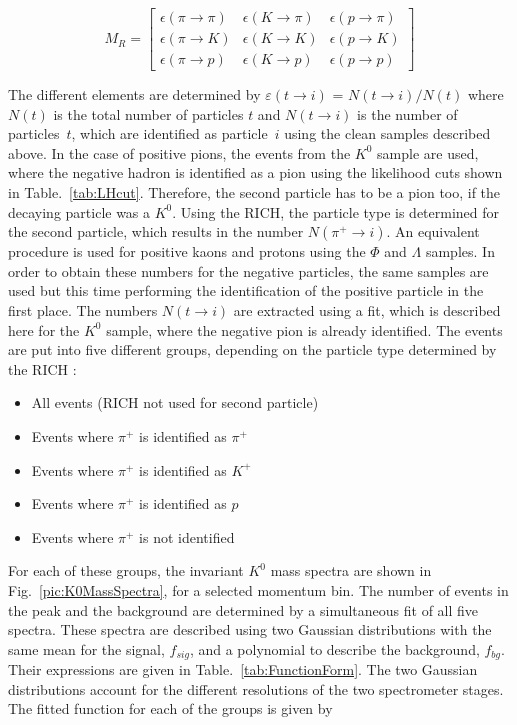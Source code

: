 \begin{equation}
  M_R
  =
  \begin{bmatrix}
  \epsilon(\pi \rightarrow \pi) & \epsilon(K \rightarrow \pi) & \epsilon(p \rightarrow \pi)\\
  \epsilon(\pi \rightarrow K) & \epsilon(K \rightarrow K) & \epsilon(p \rightarrow K) \\
  \epsilon(\pi \rightarrow p) & \epsilon(K \rightarrow p) & \epsilon(p \rightarrow p)
  \end{bmatrix}
\end{equation}

The different elements are determined by $\varepsilon(t \rightarrow i)$ = $N(t \rightarrow i)/N(t)$ where $N(t)$ is the total number of particles $t$ and $N(t \rightarrow i)$ is the number of particles~$t$, which are identified as particle~$i$ using the clean samples described above. In the case of positive pions, the events from the $K^0$ sample are used, where the negative hadron is identified as a pion using the likelihood cuts shown in Table.~\ref{tab:LHcut}.  Therefore, the second particle has to be a pion too, if the decaying particle was a $K^0$. Using the RICH, the particle type is determined for the second particle, which  results in the number $N(\pi^+ \rightarrow i)$. An equivalent procedure is used for positive kaons and protons using the $\Phi$ and $\Lambda$ samples. In order to obtain these numbers for the negative particles, the same samples are used but this time performing the identification of the positive particle in the first place. The numbers $N(t \rightarrow i)$ are extracted using a fit, which is described here for the $K^0$ sample, where the negative pion is already identified. The events are put into five different groups, depending on the particle type determined by the RICH :

\begin{itemize}
  \item All events (RICH not used for second particle)
  \item Events where $\pi^+$ is identified as $\pi^+$
  \item Events where $\pi^+$ is identified as $K^+$
  \item Events where $\pi^+$ is identified as $p$
  \item Events where $\pi^+$ is not identified
\end{itemize}

For each of these groups, the invariant $K^0$ mass spectra are shown in Fig.~\ref{pic:K0MassSpectra}, for a selected momentum bin. The number of events in the peak and the background are determined by a simultaneous fit of all five spectra. These spectra are described using two Gaussian distributions with the same mean for the signal, $f_{sig}$, and a polynomial to describe the background, $f_{bg}$. Their expressions are given in Table.~\ref{tab:FunctionForm}. The two Gaussian distributions account for the different resolutions of the two spectrometer stages. The fitted function for each of the groups is given by

